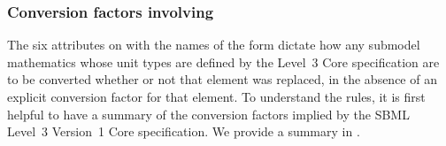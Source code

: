 \subsubsection{Conversion factors involving }

The six attributes on \Submodel with the names of the form
 dictate how any submodel
mathematics whose unit types are defined by the Level~3 Core
specification are to be converted whether or not that element was
replaced, in the absence of an explicit conversion factor for that
element.  To understand the rules, it is first helpful to have a summary
of the conversion factors implied by the SBML Level~3 Version~1 Core
specification.  We provide a summary in .

\newcommand{\sprd}[2]{\raisebox{-#1pt}[0pt][(#1pt * 2) + 4pt]{#2}}
\newcommand{\persymb}{\emph{Conversion factor for referenced object}}
\newcommand{\percomp}{\emph{Conversion factor for compartment}}
\newcommand{\allat}{\emph{(All)}}
\newcommand{\hosu}{\token{hasOnlySubstanceUnits}}

